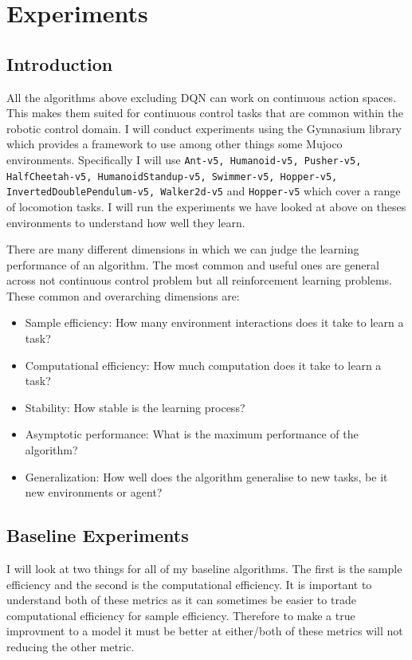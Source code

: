 \chapter{Experiments}\label{C:experiments}

\section{Introduction}

All the algorithms above excluding DQN can work on continuous action spaces. This makes them suited for continuous control tasks that are common within the robotic control domain. I will conduct experiments using the Gymnasium \cite{towers2024gymnasium} library which provides a framework to use among other things some Mujoco \cite{todorov2012mujoco} environments. Specifically I will use \texttt{Ant-v5, Humanoid-v5, Pusher-v5, HalfCheetah-v5, HumanoidStandup-v5, Swimmer-v5, Hopper-v5, InvertedDoublePendulum-v5, Walker2d-v5} and \texttt{Hopper-v5} which cover a range of locomotion tasks. I will run the experiments we have looked at above on theses environments to understand how well they learn.

There are many different dimensions in which we can judge the learning performance of an algorithm. The most common and useful ones are general across not continuous control problem but all reinforcement learning problems. These common and overarching dimensions are:

\begin{itemize}
    \item Sample efficiency: How many environment interactions does it take to learn a task?
    \item Computational efficiency: How much computation does it take to learn a task?
    \item Stability: How stable is the learning process?
    \item Asymptotic performance: What is the maximum performance of the algorithm?
    \item Generalization: How well does the algorithm generalise to new tasks, be it new environments or agent?
\end{itemize}

\section{Baseline Experiments}

I will look at two things for all of my baseline algorithms. The first is the sample efficiency and the second is the computational efficiency. It is important to understand both of these metrics as it can sometimes be easier to trade computational efficiency for sample efficiency. Therefore to make a true improvment to a model it must be better at either/both of these metrics will not reducing the other metric.

